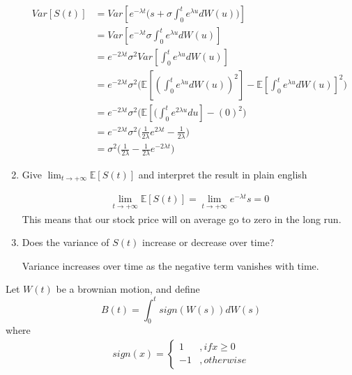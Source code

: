 \documentclass[12pt,twoside, letter]{exam}
\theoremstyle{definition}
\newcommand{\ee}{\mathbb{E}}
\begin{document}
\begin{enumerate}
\begin{solution}
\begin{align*}
        Var[S(t)] &= Var[e^{-\lambda t}\big(s + \sigma \int^t_0 e^{\lambda u}  dW(u) \big)] \\
        &= Var[e^{-\lambda t}\sigma \int^t_0 e^{\lambda u}  dW(u)] \\
        &= e^{-2\lambda t}\sigma^2 Var[\int^t_0 e^{\lambda u}  dW(u)] \\
        &= e^{-2\lambda t}\sigma^2 \bigg( \ee[(\int^t_0 e^{\lambda u}  dW(u))^2] - \ee[\int^t_0 e^{\lambda u}  dW(u)]^2 \bigg) \\
        &= e^{-2\lambda t}\sigma^2 \bigg( \ee[(\int^t_0 e^{2\lambda u}  du] - (0)^2 \bigg) \\
        &= e^{-2\lambda t}\sigma^2 \bigg( \frac{1}{2\lambda} e^{2\lambda t} - \frac{1}{2\lambda} \bigg) \\
        &= \sigma^2 \bigg( \frac{1}{2\lambda} - \frac{1}{2\lambda}e^{-2\lambda t} \bigg)
      \end{align*}

    \end{solution}
  \item Give $\lim_{t \rightarrow +\infty} \ee[S(t)]$ and interpret the result in plain english
    \begin{solution}
      \begin{align*}
        \lim_{t \rightarrow +\infty} \ee[S(t)] = \lim_{t \rightarrow +\infty} e^{-\lambda t}s = 0
      \end{align*}
      This means that our stock price will on average go to zero in the long run.
    \end{solution}
  \item Does the variance of $S(t)$ increase or decrease over time?
    \begin{solution}
      Variance increases over time as the negative term vanishes with time.
    \end{solution}
\end{enumerate}

 Let $W(t)$ be a brownian motion, and define
  \begin{equation*}
    B(t) = \int^t_0 sign(W(s)) dW(s)
  \end{equation*}
  where
  \begin{align*}
    sign(x) =
      \begin{cases}
        1 &, if x \geq 0 \\
        -1 &, otherwise
      \end{cases}
  \end{align*}
\end{document}
